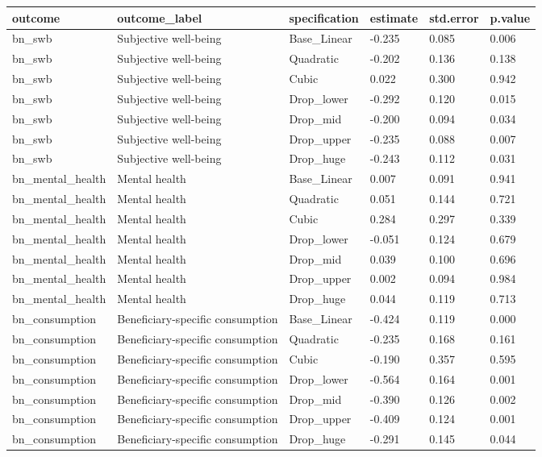 \begin{tabular}{llllll}
\toprule
outcome & outcome\_label & specification & estimate & std.error & p.value
 \\
\midrule
bn\_swb & Subjective well-being & Base\_Linear & -0.235 & 0.085 & 0.006 \\
bn\_swb & Subjective well-being & Quadratic & -0.202 & 0.136 & 0.138 \\
bn\_swb & Subjective well-being & Cubic & 0.022 & 0.300 & 0.942 \\
bn\_swb & Subjective well-being & Drop\_lower & -0.292 & 0.120 & 0.015 \\
bn\_swb & Subjective well-being & Drop\_mid & -0.200 & 0.094 & 0.034 \\
bn\_swb & Subjective well-being & Drop\_upper & -0.235 & 0.088 & 0.007 \\
bn\_swb & Subjective well-being & Drop\_huge & -0.243 & 0.112 & 0.031 \\
bn\_mental\_health & Mental health & Base\_Linear & 0.007 & 0.091 & 0.941 \\
bn\_mental\_health & Mental health & Quadratic & 0.051 & 0.144 & 0.721 \\
bn\_mental\_health & Mental health & Cubic & 0.284 & 0.297 & 0.339 \\
bn\_mental\_health & Mental health & Drop\_lower & -0.051 & 0.124 & 0.679 \\
bn\_mental\_health & Mental health & Drop\_mid & 0.039 & 0.100 & 0.696 \\
bn\_mental\_health & Mental health & Drop\_upper & 0.002 & 0.094 & 0.984 \\
bn\_mental\_health & Mental health & Drop\_huge & 0.044 & 0.119 & 0.713 \\
bn\_consumption & Beneficiary-specific consumption & Base\_Linear & -0.424 & 0.119 & 0.000 \\
bn\_consumption & Beneficiary-specific consumption & Quadratic & -0.235 & 0.168 & 0.161 \\
bn\_consumption & Beneficiary-specific consumption & Cubic & -0.190 & 0.357 & 0.595 \\
bn\_consumption & Beneficiary-specific consumption & Drop\_lower & -0.564 & 0.164 & 0.001 \\
bn\_consumption & Beneficiary-specific consumption & Drop\_mid & -0.390 & 0.126 & 0.002 \\
bn\_consumption & Beneficiary-specific consumption & Drop\_upper & -0.409 & 0.124 & 0.001 \\
bn\_consumption & Beneficiary-specific consumption & Drop\_huge & -0.291 & 0.145 & 0.044 \\

\end{tabular}
